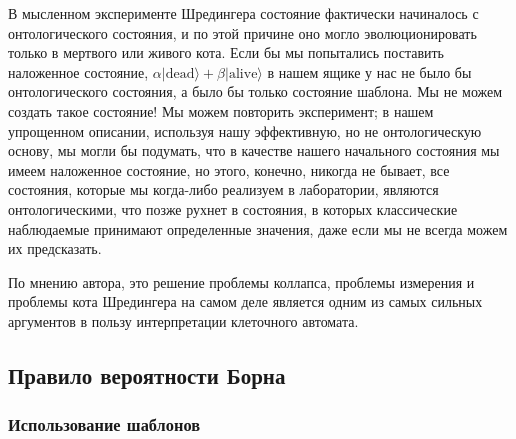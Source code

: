 \documentclass[main.tex]{subfiles}
\begin{document}
В мысленном эксперименте Шредингера состояние фактически начиналось с онтологического состояния, и по этой причине оно могло эволюционировать только в мертвого или живого кота. Если бы мы попытались поставить наложенное состояние, $\alpha|\mathrm{dead}\rangle + \beta|\mathrm{alive}\rangle$ в нашем ящике у нас не было бы онтологического состояния, а было бы только состояние шаблона. Мы не можем создать такое состояние! Мы можем повторить эксперимент; в нашем упрощенном описании, используя нашу эффективную, но не онтологическую основу, мы могли бы подумать, что в качестве нашего начального состояния мы имеем наложенное состояние, но этого, конечно, никогда не бывает, все состояния, которые мы когда-либо реализуем в лаборатории, являются онтологическими, что позже рухнет в состояния, в которых классические наблюдаемые принимают определенные значения, даже если мы не всегда можем их предсказать.

По мнению автора, это решение проблемы коллапса, проблемы измерения и проблемы кота Шредингера на самом деле является одним из самых сильных аргументов в пользу интерпретации клеточного автомата.

\subsection{Правило вероятности Борна}\label{ch4.3}

\subsubsection{Использование шаблонов}\label{ch4.3.1}
\end{document}
